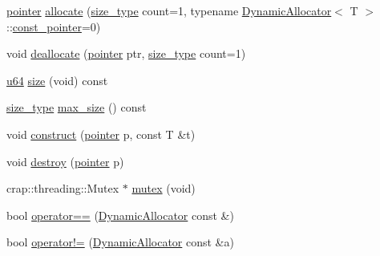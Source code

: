 \begin{DoxyCompactItemize}
\item 
\hyperlink{classcrap_1_1memory_1_1_dynamic_allocator_a281b8cb1ad7cd494edf5f6b67daea60a}{pointer} \hyperlink{classcrap_1_1memory_1_1_dynamic_allocator_a1cf11dd8fbd8194f982dabbae68be68b}{allocate} (\hyperlink{classcrap_1_1memory_1_1_dynamic_allocator_a48b438ee17d8e7a384bde751f72ef17b}{size\-\_\-type} count=1, typename \hyperlink{classcrap_1_1memory_1_1_dynamic_allocator}{Dynamic\-Allocator}$<$ T $>$\-::\hyperlink{classcrap_1_1memory_1_1_dynamic_allocator_a31367ceafaf5d2a05c3a04e975e53775}{const\-\_\-pointer}=0)
\item 
void \hyperlink{classcrap_1_1memory_1_1_dynamic_allocator_a5cb10c0a9e3c23f66ee56cd012d852c2}{deallocate} (\hyperlink{classcrap_1_1memory_1_1_dynamic_allocator_a281b8cb1ad7cd494edf5f6b67daea60a}{pointer} ptr, \hyperlink{classcrap_1_1memory_1_1_dynamic_allocator_a48b438ee17d8e7a384bde751f72ef17b}{size\-\_\-type} count=1)
\item 
\hyperlink{types_8h_a3f7e2bcbb0b4c338f3c4f6c937cd4234}{u64} \hyperlink{classcrap_1_1memory_1_1_dynamic_allocator_ac5b63c7fc39aca96441922f44f53e922}{size} (void) const 
\item 
\hyperlink{classcrap_1_1memory_1_1_dynamic_allocator_a48b438ee17d8e7a384bde751f72ef17b}{size\-\_\-type} \hyperlink{classcrap_1_1memory_1_1_dynamic_allocator_a6a9ef62e15aa9e3cfae93570e3bab145}{max\-\_\-size} () const 
\item 
void \hyperlink{classcrap_1_1memory_1_1_dynamic_allocator_a998be07e957bdd0b7ac34de181ae50f7}{construct} (\hyperlink{classcrap_1_1memory_1_1_dynamic_allocator_a281b8cb1ad7cd494edf5f6b67daea60a}{pointer} p, const T \&t)
\item 
void \hyperlink{classcrap_1_1memory_1_1_dynamic_allocator_a1734a7398ced6882115743f938be9a77}{destroy} (\hyperlink{classcrap_1_1memory_1_1_dynamic_allocator_a281b8cb1ad7cd494edf5f6b67daea60a}{pointer} p)
\item 
crap\-::threading\-::\-Mutex $\ast$ \hyperlink{classcrap_1_1memory_1_1_dynamic_allocator_a822eab56a3d8eaf52592da6a29018a41}{mutex} (void)
\item 
bool \hyperlink{classcrap_1_1memory_1_1_dynamic_allocator_a74d7390d46f343bc4d1dc35569caf9fa}{operator==} (\hyperlink{classcrap_1_1memory_1_1_dynamic_allocator}{Dynamic\-Allocator} const \&)
\item 
bool \hyperlink{classcrap_1_1memory_1_1_dynamic_allocator_a3db59cc87b49f4ebd3d5b87233b12990}{operator!=} (\hyperlink{classcrap_1_1memory_1_1_dynamic_allocator}{Dynamic\-Allocator} const \&a)
\end{DoxyCompactItemize}
